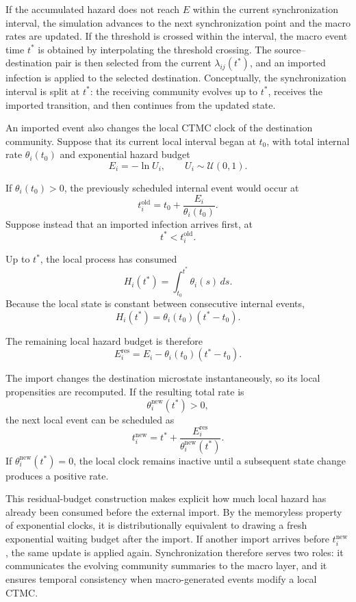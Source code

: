 \documentclass[a4paper,fleqn]{cas-sc}
\begin{document}
If the accumulated hazard does not reach $E$ within the current synchronization interval, the simulation advances to the next synchronization point and the macro rates are updated. If the threshold is crossed within the interval, the macro event time $t^\ast$ is obtained by interpolating the threshold crossing. The source--destination pair is then selected from the current $\lambda_{ij}(t^\ast)$, and an imported infection is applied to the selected destination. Conceptually, the synchronization interval is split at $t^\ast$: the receiving community evolves up to $t^\ast$, receives the imported transition, and then continues from the updated state.

An imported event also changes the local CTMC clock of the destination community. Suppose that its current local interval began at $t_0$, with total internal rate $\theta_i(t_0)$ and exponential hazard budget
\[
E_i
=
-\ln U_i,
\qquad
U_i\sim\mathcal{U}(0,1).
\]

If $\theta_i(t_0)>0$, the previously scheduled internal event would occur at
\[
t_i^{\mathrm{old}}
=
t_0
+
\frac{E_i}{\theta_i(t_0)}.
\]
Suppose instead that an imported infection arrives first, at
\[
t^\ast
<
t_i^{\mathrm{old}}.
\]

Up to $t^\ast$, the local process has consumed
\[
H_i(t^\ast)
=
\int_{t_0}^{t^\ast}
\theta_i(s)\,ds.
\]
Because the local state is constant between consecutive internal events,
\[
H_i(t^\ast)
=
\theta_i(t_0)
\left(
t^\ast-t_0
\right).
\]

The remaining local hazard budget is therefore
\[
E_i^{\mathrm{res}}
=
E_i
-
\theta_i(t_0)
\left(
t^\ast-t_0
\right).
\]

The import changes the destination microstate instantaneously, so its local propensities are recomputed. If the resulting total rate is
\[
\theta_i^{\mathrm{new}}(t^\ast)>0,
\]
the next local event can be scheduled as
\[
t_i^{\mathrm{new}}
=
t^\ast
+
\frac{
E_i^{\mathrm{res}}
}{
\theta_i^{\mathrm{new}}(t^\ast)
}.
\]
If $\theta_i^{\mathrm{new}}(t^\ast)=0$, the local clock remains inactive until a subsequent state change produces a positive rate.

This residual-budget construction makes explicit how much local hazard has already been consumed before the external import. By the memoryless property of exponential clocks, it is distributionally equivalent to drawing a fresh exponential waiting budget after the import. If another import arrives before $t_i^{\mathrm{new}}$, the same update is applied again. Synchronization therefore serves two roles: it communicates the evolving community summaries to the macro layer, and it ensures temporal consistency when macro-generated events modify a local CTMC.
\end{document}
